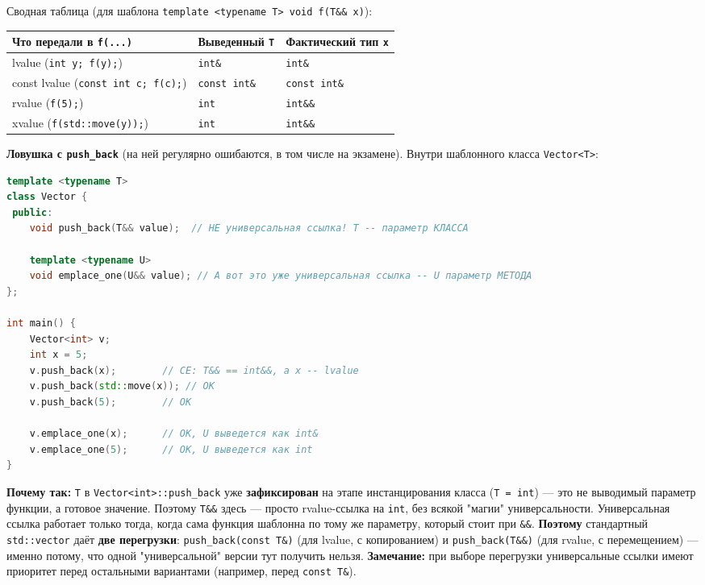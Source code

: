 Сводная таблица (для шаблона \texttt{template <typename T> void f(T\&\& x)}):
\begin{center}
\begin{tabular}{|l|l|l|}
\hline
\textbf{Что передали в \texttt{f(...)}} & \textbf{Выведенный \texttt{T}} & \textbf{Фактический тип \texttt{x}} \\
\hline
lvalue (\texttt{int y; f(y);}) & \texttt{int\&} & \texttt{int\&} \\
const lvalue (\texttt{const int c; f(c);}) & \texttt{const int\&} & \texttt{const int\&} \\
rvalue (\texttt{f(5);}) & \texttt{int} & \texttt{int\&\&} \\
xvalue (\texttt{f(std::move(y));}) & \texttt{int} & \texttt{int\&\&} \\
\hline
\end{tabular}
\end{center}
\textbf{Ловушка с \texttt{push\_back}} (на ней регулярно ошибаются, в том числе на экзамене). Внутри шаблонного класса \texttt{Vector<T>}:
\begin{lstlisting}[language=C++]
template <typename T>
class Vector {
 public:
    void push_back(T&& value);  // НЕ универсальная ссылка! T -- параметр КЛАССА

    template <typename U>
    void emplace_one(U&& value); // А вот это уже универсальная ссылка -- U параметр МЕТОДА
};

int main() {
    Vector<int> v;
    int x = 5;
    v.push_back(x);        // CE: T&& == int&&, а x -- lvalue
    v.push_back(std::move(x)); // OK
    v.push_back(5);        // OK

    v.emplace_one(x);      // OK, U выведется как int&
    v.emplace_one(5);      // OK, U выведется как int
}
\end{lstlisting}
\textbf{Почему так:} \texttt{T} в \texttt{Vector<int>::push\_back} уже \textbf{зафиксирован} на этапе инстанцирования класса (\texttt{T = int}) --- это не выводимый параметр функции, а готовое значение. Поэтому \texttt{T\&\&} здесь --- просто rvalue-ссылка на \texttt{int}, без всякой "магии" универсальности. Универсальная ссылка работает только тогда, когда сама функция шаблонна по тому же параметру, который стоит при \texttt{\&\&}.
\textbf{Поэтому} стандартный \texttt{std::vector} даёт \textbf{две перегрузки}: \texttt{push\_back(const T\&)} (для lvalue, с копированием) и \texttt{push\_back(T\&\&)} (для rvalue, с перемещением) --- именно потому, что одной "универсальной" версии тут получить нельзя.
\textbf{Замечание:} при выборе перегрузки универсальные ссылки имеют приоритет перед остальными вариантами (например, перед \texttt{const T\&}).
